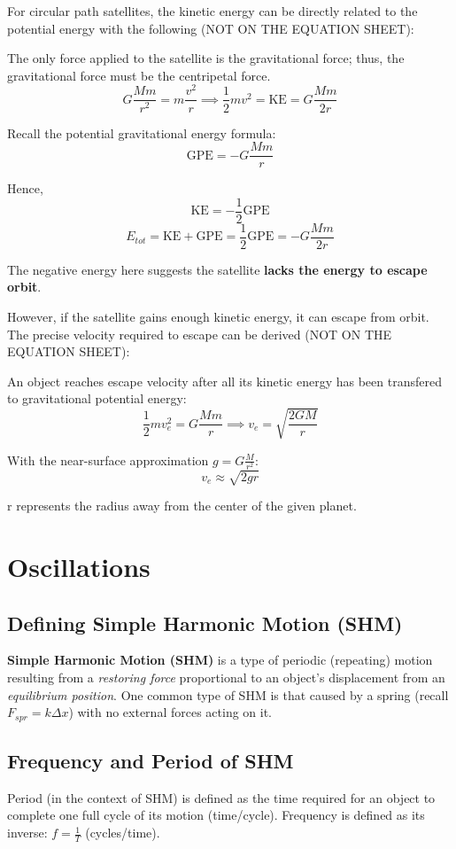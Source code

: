 \documentclass{article}
\begin{document}
For circular path satellites, the kinetic energy can be directly related to the potential energy with the following (NOT ON THE EQUATION SHEET):

The only force applied to the satellite is the gravitational force; thus, the gravitational force must be the centripetal force.
\[G\frac{Mm}{r^2} = m\frac{v^2}{r} \implies \frac{1}{2}mv^2 = \textrm{KE} = G\frac{Mm}{2r}\]

Recall the potential gravitational energy formula:
\[\textrm{GPE} = - G\frac{Mm}{r}\]

Hence,
\[\boxed{\textrm{KE} = -\frac{1}{2}\textrm{GPE}}\]
\[\boxed{E_{tot} = \textrm{KE} + \textrm{GPE} = \frac{1}{2}\textrm{GPE} = -G\frac{Mm}{2r}}\]

The negative energy here suggests the satellite \textbf{lacks the energy to escape orbit}.

However, if the satellite gains enough kinetic energy, it can escape from orbit.
The precise velocity required to escape can be derived (NOT ON THE EQUATION SHEET):

An object reaches escape velocity after all its kinetic energy has been transfered to gravitational potential energy:
\[\frac{1}{2}mv_e^2 = G\frac{Mm}{r} \implies \boxed{v_e = \sqrt{\frac{2GM}{r}}}\]

With the near-surface approximation $g = G\frac{M}{r^2}$:
\[v_e \approx \sqrt{2gr}\]

r represents the radius away from the center of the given planet.

\newpage

\section{Oscillations}

\subsection{Defining Simple Harmonic Motion (SHM)}
\textbf{Simple Harmonic Motion (SHM)} is a type of periodic (repeating) motion resulting from a \textit{restoring force} proportional to an object's displacement from an \textit{equilibrium position}.
One common type of SHM is that caused by a spring (recall $F_{spr} = k \Delta x$) with no external forces acting on it.

\subsection{Frequency and Period of SHM}
Period (in the context of SHM) is defined as the time required for an object to complete one full cycle of its motion (time/cycle).
Frequency is defined as its inverse: $f = \frac{1}{T}$ (cycles/time).
\end{document}
